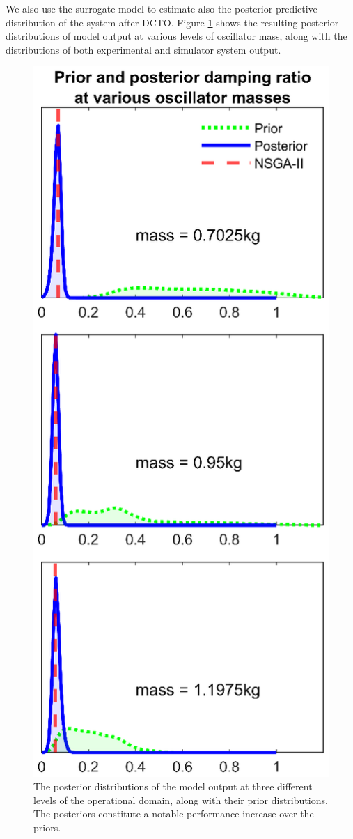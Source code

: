 \documentclass[10pt]{asme2ej}
\begin{document}
%
We also use the surrogate model to estimate also the posterior predictive distribution of the system after DCTO.
%
Figure \ref{fig:dvs_output} shows the resulting posterior distributions of model output at various levels of oscillator mass, along with the distributions of both experimental and simulator system output.
%
\begin{figure}
	\centering
	\includegraphics[scale=0.85]{figures/figure_12.eps}
	\captionsetup{width=.85\linewidth}
	\caption{The posterior distributions of the model output at three different levels of the operational domain, along with their prior distributions. The posteriors constitute a notable performance increase over the priors.}
	\label{fig:dvs_output}
\end{figure}
\end{document}
